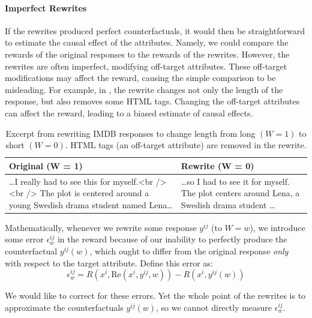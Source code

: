 \documentclass{article}
\begin{document}
\paragraph{Imperfect Rewrites}
If the rewrites produced perfect counterfactuals, it would then be straightforward to estimate the causal effect of the attributes. Namely, we could compare the rewards of the original responses to the rewards of the rewrites. However, the rewrites are often imperfect, modifying off-target attributes. These off-target modifications may affect the reward, causing the simple comparison to be misleading. For example, in , the rewrite changes not only the length of the response, but also removes some HTML tags. Changing the off-target attributes can affect the reward, leading to a biased estimate of causal effects.
\begin{table}[t]
  \centering
  \small
  \renewcommand{\arraystretch}{1.25}
  \begin{tabular}{|p{4cm}|p{4cm}|}
  \hline
  \textbf{Original (W = 1)} & \textbf{Rewrite (W = 0)} \\
  \hline
  \ldots I really had to see this for myself.<br /><br /> The plot is centered around a young Swedish drama student named Lena\ldots & \ldots so I had to see it for myself. The plot centers around Lena, a Swedish drama student \ldots \\
  \hline
  \end{tabular}
  \caption{Excerpt from rewriting IMDB responses to change length from long $(W = 1)$ to short $(W = 0)$. HTML tags (an off-target attribute) are removed in the rewrite.}
  \label{tab:formatting_v2}
\end{table}

Mathematically, whenever we rewrite some response $y^{ij}$ (to $W = w$), we introduce some error $\epsilon^{ij}_w$ in the reward because of our inability to perfectly produce the counterfactual $y^{ij}(w)$, which ought to differ from the original response \emph{only} with respect to the target attribute. Define this error as:
  \[\epsilon^{ij}_w = R(x^i, \text{Re}(x^i, y^{ij}, w)) - R(x^i, y^{ij}(w)) \]

We would like to correct for these errors. Yet the whole point of the rewrites is to approximate the counterfactuals $y^{ij}(w)$, so we cannot directly measure $\epsilon^{ij}_w$.
\end{document}
